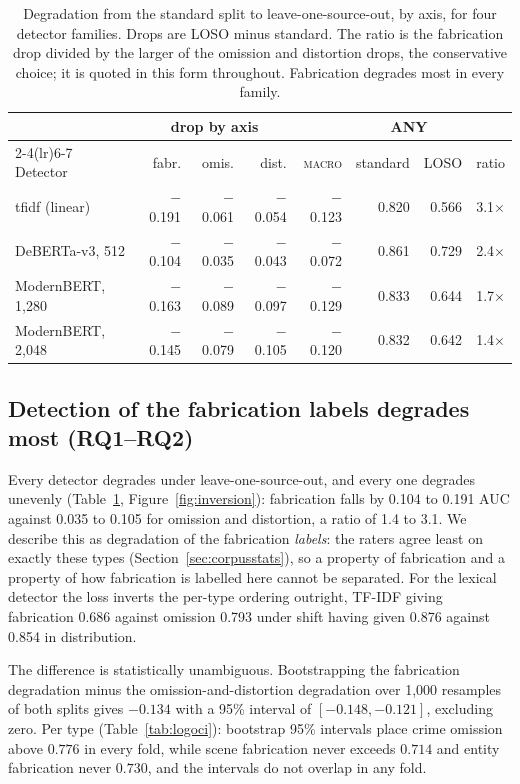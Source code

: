 \documentclass{article}
\begin{document}
\begin{table}[t]
\caption{Degradation from the standard split to leave-one-source-out, by axis,
for four detector families. Drops are LOSO minus standard. The ratio is the
fabrication drop divided by the larger of the omission and distortion drops,
the conservative choice; it is quoted in this form throughout. Fabrication
degrades most in every family.}
\label{tab:families}
\centering\footnotesize
\setlength{\tabcolsep}{4pt}
\begin{tabular}{lrrrrrrr}
\toprule
 & \multicolumn{3}{c}{drop by axis} & & \multicolumn{2}{c}{ANY} & \\
\cmidrule(lr){2-4}\cmidrule(lr){6-7}
Detector & fabr. & omis. & dist. & \textsc{macro} & standard & LOSO & ratio \\
\midrule
tfidf (linear)      & $-$0.191 & $-$0.061 & $-$0.054 & $-$0.123 & 0.820 & 0.566 & 3.1$\times$ \\
DeBERTa-v3, 512     & $-$0.104 & $-$0.035 & $-$0.043 & $-$0.072 & 0.861 & 0.729 & 2.4$\times$ \\
ModernBERT, 1{,}280 & $-$0.163 & $-$0.089 & $-$0.097 & $-$0.129 & 0.833 & 0.644 & 1.7$\times$ \\
ModernBERT, 2{,}048 & $-$0.145 & $-$0.079 & $-$0.105 & $-$0.120 & 0.832 & 0.642 & 1.4$\times$ \\
\bottomrule
\end{tabular}
\end{table}

\subsection{Detection of the fabrication labels degrades most (RQ1--RQ2)}
\label{sec:inversion}

Every detector degrades under leave-one-source-out, and every one degrades
unevenly (Table~\ref{tab:families}, Figure~\ref{fig:inversion}): fabrication
falls by 0.104 to 0.191 AUC against 0.035 to 0.105 for omission and distortion,
a ratio of 1.4 to 3.1. We describe this as degradation of the fabrication
\emph{labels}: the raters agree least on exactly these types
(Section~\ref{sec:corpusstats}), so a property of fabrication and a property of
how fabrication is labelled here cannot be separated. For the lexical detector
the loss inverts the per-type ordering outright, TF-IDF giving fabrication 0.686 against omission 0.793 under
shift having given 0.876 against 0.854 in distribution.

The difference is statistically unambiguous. Bootstrapping the fabrication
degradation minus the omission-and-distortion degradation over 1{,}000
resamples of both splits gives $-0.134$ with a 95\% interval of
$[-0.148, -0.121]$, excluding zero. Per type
(Table~\ref{tab:logoci}): bootstrap 95\% intervals place crime omission above
$0.776$ in every fold, while scene fabrication never exceeds $0.714$ and entity
fabrication never $0.730$, and the intervals do not overlap in any fold.
\end{document}
